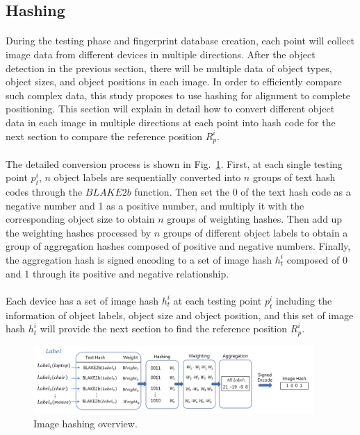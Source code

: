 \documentclass[a4paper,12pt]{report}
\begin{document}
\subsection{Hashing}

\paragraph{}
During the testing phase and fingerprint database creation, each point will collect image data from different devices in multiple directions. After the object detection in the previous section, there will be multiple data of object types, object sizes, and object positions in each image. In order to efficiently compare such complex data, this study proposes to use hashing for alignment to complete positioning. This section will explain in detail how to convert different object data in each image in multiple directions at each point into hash code for the next section to compare the reference position $R_p^{i}$.

\paragraph{} 
The detailed conversion process is shown in Fig.~\ref{figure:3_4_Image_Hash}. First, at each single testing point $p_t^i$, $n$ object labels are sequentially converted into $n$ groups of text hash codes through the $BLAKE2b$ function. Then set the 0 of the text hash code as a negative number and 1 as a positive number, and multiply it with the corresponding object size to obtain $n$ groups of weighting hashes. Then add up the weighting hashes processed by $n$ groups of different object labels to obtain a group of aggregation hashes composed of positive and negative numbers. Finally, the aggregation hash is signed encoding to a set of image hash $h_t^{i}$ composed of 0 and 1 through its positive and negative relationship.
%

\paragraph{} 
Each device has a set of image hash $h_t^{i}$ at each testing point $p_t^i$ including the information of object labels, object size and object position, and this set of image hash $h_t^{i}$ will provide the next section to find the reference position $R_p^{i}$.
%

\begin{figure}[tbph]
    \begin{center}
    \includegraphics[width=0.95\textwidth]{images/3_4_Image_Hash.png}
    \caption{Image hashing overview.}
    \label{figure:3_4_Image_Hash}
    \end{center}
\end{figure}
\end{document}
